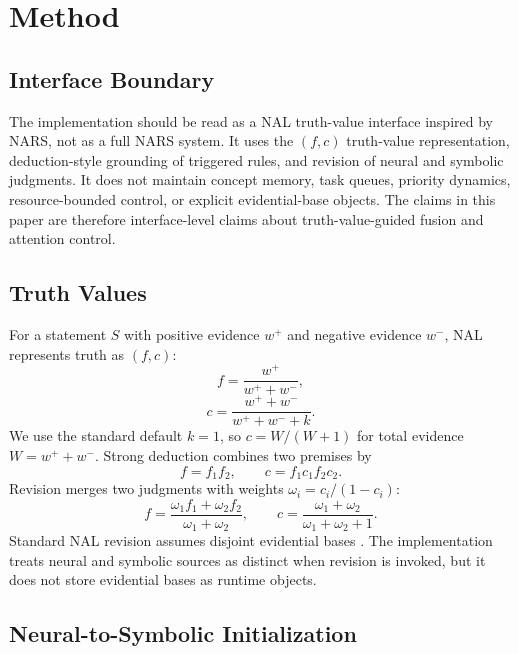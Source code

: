 \documentclass[final]{nesy2026}
\begin{document}
\section{Method}
\label{sec:method}

\subsection{Interface Boundary}

The implementation should be read as a NAL truth-value interface inspired by NARS, not as a full NARS system. It uses the $(f,c)$ truth-value representation, deduction-style grounding of triggered rules, and revision of neural and symbolic judgments. It does not maintain concept memory, task queues, priority dynamics, resource-bounded control, or explicit evidential-base objects. The claims in this paper are therefore interface-level claims about truth-value-guided fusion and attention control.

\subsection{Truth Values}

For a statement $S$ with positive evidence $w^+$ and negative evidence $w^-$, NAL represents truth as $(f,c)$:
\begin{equation}
f=\frac{w^+}{w^+ + w^-},
\label{eq:frequency}
\end{equation}
\begin{equation}
c=\frac{w^+ + w^-}{w^+ + w^- + k}.
\label{eq:confidence}
\end{equation}
We use the standard default $k=1$, so $c=W/(W+1)$ for total evidence $W=w^+ + w^-$. Strong deduction combines two premises by
\begin{equation}
f=f_1f_2,\qquad c=f_1c_1f_2c_2.
\label{eq:deduction}
\end{equation}
Revision merges two judgments with weights $\omega_i=c_i/(1-c_i)$:
\begin{equation}
f=\frac{\omega_1 f_1+\omega_2 f_2}{\omega_1+\omega_2},\qquad
c=\frac{\omega_1+\omega_2}{\omega_1+\omega_2+1}.
\label{eq:revision}
\end{equation}
Standard NAL revision assumes disjoint evidential bases \citep{wang2024draft}. The implementation treats neural and symbolic sources as distinct when revision is invoked, but it does not store evidential bases as runtime objects.

\subsection{Neural-to-Symbolic Initialization}
\end{document}
